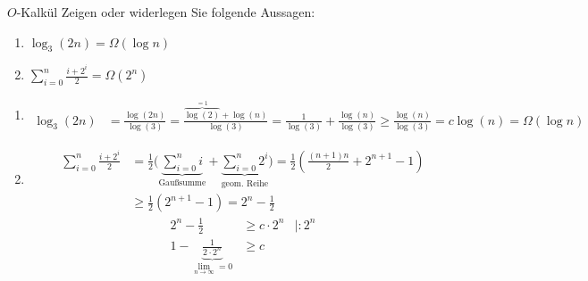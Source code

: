 \documentclass[11pt,a4paper]{article}
\begin{document}
\begin{aufgabe}{2}{$O$-Kalkül}
    Zeigen oder widerlegen Sie folgende Aussagen:
    \begin{enumerate}
        \item $\log_3(2n) = \Omega(\log n)$
        \item $\sum\limits_{i=0}^n \frac{i + 2^i}{2} = \Omega(2^n)$
    \end{enumerate}
\end{aufgabe}
\begin{loesung}
    \begin{enumerate}
        \item 
        \begin{align*}
            \log_3(2n) &= \frac{\log(2n)}{\log(3)}
            = \frac{\overbrace{\log(2)}^{=1} + \log(n)}{\log(3)}
            = \frac{1}{\log(3)} + \frac{\log(n)}{\log(3)}
            \geq \frac{\log(n)}{\log(3)}
            = c \log(n) = \Omega(\log n)
        \end{align*}
        \item
        \begin{align*}
            \sum\limits_{i=0}^n \frac{i + 2^i}{2} 
            &= \frac{1}{2}\Bigg( \underbrace{\sum\limits_{i = 0}^n i}_{\text{Gaußsumme}} + \underbrace{\sum\limits_{i = 0}^n 2^i}_{\text{geom. Reihe}}\Bigg)
            = \frac{1}{2}\left(\frac{(n + 1)n}{2} + 2^{n + 1} - 1\right) \\
            &\geq \frac{1}{2} \left(2^{n + 1} - 1\right)
            = 2^n - \frac{1}{2}
        \end{align*}
        \begin{align*}
            2^n - \frac{1}{2}
            &\geq c \cdot 2^n
            & | : 2^n \\
            1 - \underbrace{\frac{1}{2 \cdot 2^n}}_{\lim\limits_{n \rightarrow \infty}=0} 
            &\geq c
        \end{align*}
    \end{enumerate}
\end{loesung}
\end{document}
